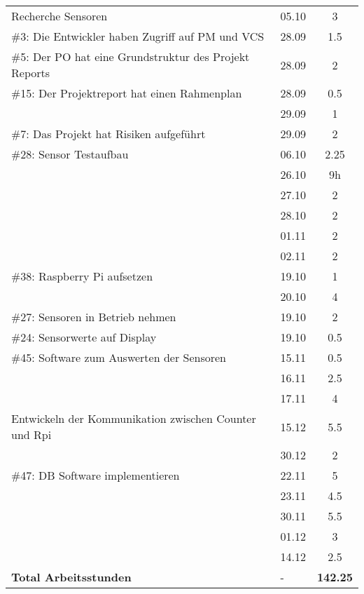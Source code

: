 \documentclass[a4paper, 10pt, fleqn]{article}
\newcommand{\footer}{\midrule\textbf{Total Arbeitsstunden}&-&\textbf{142.25}\\\midrule\bottomrule}
\begin{document}
\begin{longtable}{p{9cm}|p{2cm}|c}
        Recherche Sensoren & 05.10 & 3\\
        \#3: Die Entwickler haben Zugriff auf PM und VCS& 28.09 & 1.5\\
        \#5: Der PO hat eine Grundstruktur des Projekt Reports& 28.09 & 2\\
        \#15: Der Projektreport hat einen Rahmenplan & 28.09 & 0.5\\
        & 29.09 & 1\\
        \#7: Das Projekt hat Risiken aufgeführt & 29.09 & 2\\
        \#28: Sensor Testaufbau & 06.10 & 2.25\\
        & 26.10 & 9h \\
        & 27.10 & 2\\
        & 28.10 & 2\\
        & 01.11 & 2\\
        & 02.11 & 2\\
        \#38: Raspberry Pi aufsetzen & 19.10 & 1\\
        & 20.10 & 4\\
        \#27: Sensoren in Betrieb nehmen & 19.10 & 2\\
        \#24: Sensorwerte auf Display & 19.10 & 0.5\\
        \#45: Software zum Auswerten der Sensoren & 15.11 & 0.5\\
        & 16.11 & 2.5\\
        & 17.11 & 4\\
        Entwickeln der Kommunikation zwischen Counter und Rpi & 15.12 & 5.5\\
        & 30.12 & 2\\
        \#47: DB Software implementieren & 22.11 & 5\\
        & 23.11 & 4.5\\
        & 30.11 & 5.5\\
        & 01.12 & 3\\
        & 14.12 & 2.5\\
        \footer
	\end{longtable}
\end{document}
